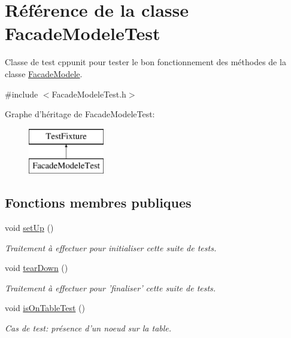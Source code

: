 \hypertarget{class_facade_modele_test}{\section{Référence de la classe Facade\-Modele\-Test}
\label{class_facade_modele_test}
}


Classe de test cppunit pour tester le bon fonctionnement des méthodes de la classe \hyperlink{class_facade_modele}{Facade\-Modele}.  




{\ttfamily \#include $<$Facade\-Modele\-Test.\-h$>$}

Graphe d'héritage de Facade\-Modele\-Test\-:\begin{figure}[H]
\begin{center}
\leavevmode
\includegraphics[height=2.000000cm]{class_facade_modele_test}
\end{center}
\end{figure}
\subsection*{Fonctions membres publiques}
\begin{DoxyCompactItemize}
\item 
void \hyperlink{group__inf2990_gaee2f8265a20182be11bcf8839311a8d8}{set\-Up} ()
\begin{DoxyCompactList}\small\item\em Traitement à effectuer pour initialiser cette suite de tests. \end{DoxyCompactList}\item 
void \hyperlink{group__inf2990_ga864b95ee45f0949e36b3670ebe6fb7c4}{tear\-Down} ()
\begin{DoxyCompactList}\small\item\em Traitement à effectuer pour 'finaliser' cette suite de tests. \end{DoxyCompactList}\item 
void \hyperlink{group__inf2990_gaddc1a794fa60c4a77818bd7ee7a4defe}{is\-On\-Table\-Test} ()
\begin{DoxyCompactList}\small\item\em Cas de test\-: présence d'un noeud sur la table. \end{DoxyCompactList}\end{DoxyCompactItemize}


